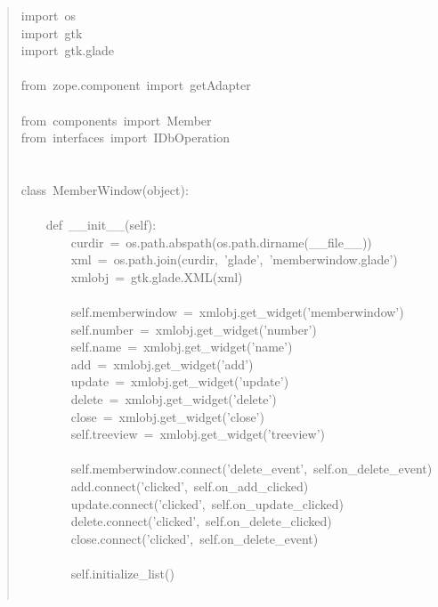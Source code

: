 \documentclass[14pt,a4paper,openany,twoside,final]{extbook}
\begin{document}
\begin{quote}{\ttfamily \raggedright \noindent
import~os\\
import~gtk\\
import~gtk.glade\\
~\\
from~zope.component~import~getAdapter\\
~\\
from~components~import~Member\\
from~interfaces~import~IDbOperation\\
~\\
~\\
class~MemberWindow(object):\\
~\\
~~~~def~\_\_init\_\_(self):\\
~~~~~~~~curdir~=~os.path.abspath(os.path.dirname(\_\_file\_\_))\\
~~~~~~~~xml~=~os.path.join(curdir,~'glade',~'memberwindow.glade')\\
~~~~~~~~xmlobj~=~gtk.glade.XML(xml)\\
~\\
~~~~~~~~self.memberwindow~=~xmlobj.get\_widget('memberwindow')\\
~~~~~~~~self.number~=~xmlobj.get\_widget('number')\\
~~~~~~~~self.name~=~xmlobj.get\_widget('name')\\
~~~~~~~~add~=~xmlobj.get\_widget('add')\\
~~~~~~~~update~=~xmlobj.get\_widget('update')\\
~~~~~~~~delete~=~xmlobj.get\_widget('delete')\\
~~~~~~~~close~=~xmlobj.get\_widget('close')\\
~~~~~~~~self.treeview~=~xmlobj.get\_widget('treeview')\\
~\\
~~~~~~~~self.memberwindow.connect('delete\_event',~self.on\_delete\_event)\\
~~~~~~~~add.connect('clicked',~self.on\_add\_clicked)\\
~~~~~~~~update.connect('clicked',~self.on\_update\_clicked)\\
~~~~~~~~delete.connect('clicked',~self.on\_delete\_clicked)\\
~~~~~~~~close.connect('clicked',~self.on\_delete\_event)\\
~\\
~~~~~~~~self.initialize\_list()\\
~\\
}
\end{quote}
\end{document}
